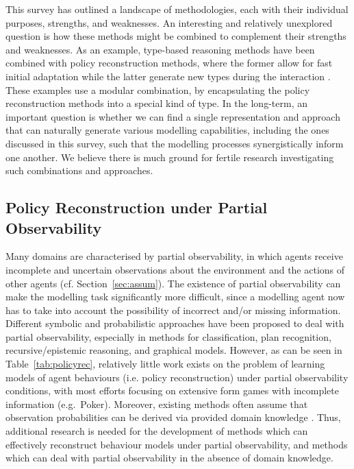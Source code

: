 \documentclass[final,1p,times,authoryear]{elsarticle}
\begin{document}
This survey has outlined a landscape of methodologies, each with their individual purposes, strengths, and weaknesses. An interesting and relatively unexplored question is how these methods might be combined to complement their strengths and weaknesses. As an example, type-based reasoning methods have been combined with policy reconstruction methods, where the former allow for fast initial adaptation while the latter generate new types during the interaction \citep{ar2013,bsk2011}. These examples use a modular combination, by encapsulating the policy reconstruction methods into a special kind of type. In the long-term, an important question is whether we can find a single representation and approach that can naturally generate various modelling capabilities, including the ones discussed in this survey, such that the modelling processes synergistically inform one another. We believe there is much ground for fertile research investigating such combinations and approaches.


		\subsection{Policy Reconstruction under Partial Observability}

Many domains are characterised by partial observability, in which agents receive incomplete and uncertain observations about the environment and the actions of other agents (cf. Section~\ref{sec:assum}). The existence of partial observability can make the modelling task significantly more difficult, since a modelling agent now has to take into account the possibility of incorrect and/or missing information. Different symbolic and probabilistic approaches have been proposed to deal with partial observability, especially in methods for classification, plan recognition, recursive/epistemic reasoning, and graphical models. However, as can be seen in Table~\ref{tab:policyrec}, relatively little work exists on the problem of learning models of agent behaviours (i.e. policy reconstruction) under partial observability conditions, with most efforts focusing on extensive form games with incomplete information (e.g.~Poker). Moreover, existing methods often assume that observation probabilities can be derived via provided domain knowledge \citep[e.g.][]{pg2017,sbl2005}. Thus, additional research is needed for the development of methods which can effectively reconstruct behaviour models under partial observability, and methods which can deal with partial observability in the absence of domain knowledge.
\end{document}

